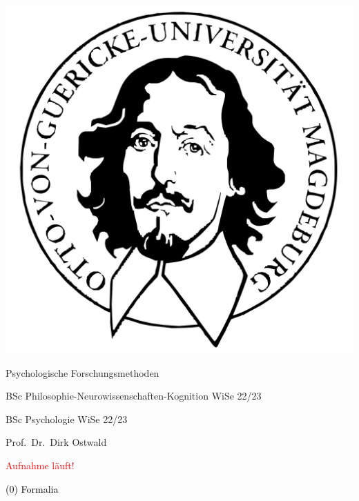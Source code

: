 \documentclass[
  8pt,
  ignorenonframetext,
]{beamer}
\author{}
\date{\vspace{-2.5em}}
\begin{document}
\begin{frame}[plain]{}
\protect\hypertarget{section}{}
\center

\begin{center}\includegraphics[width=0.2\linewidth]{0_Abbildungen/pfm_0_otto} \end{center}

\vspace{2mm}

\Large

Psychologische Forschungsmethoden \vspace{6mm}

\normalsize

BSc Philosophie-Neurowissenschaften-Kognition WiSe 22/23

BSc Psychologie WiSe 22/23

\large
\vspace{6mm}

Prof.~Dr.~Dirk Ostwald
\end{frame}

\begin{frame}[plain]{}
\protect\hypertarget{section-1}{}
\Huge
\vfill
\center

\textcolor{red}{Aufnahme läuft!} \vfill
\end{frame}

\begin{frame}[plain]{}
\protect\hypertarget{section-2}{}
\vfill
\center
\huge

\textcolor{black}{(0) Formalia} \vfill
\end{frame}
\end{document}
